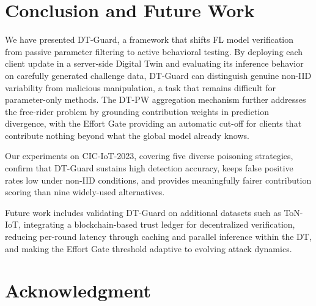 \documentclass[conference]{IEEEtran}
\begin{document}
    
    \section{Conclusion and Future Work}
    
    We have presented DT-Guard, a framework that shifts FL model verification from passive parameter filtering to active behavioral testing. By deploying each client update in a server-side Digital Twin and evaluating its inference behavior on carefully generated challenge data, DT-Guard can distinguish genuine non-IID variability from malicious manipulation, a task that remains difficult for parameter-only methods. The DT-PW aggregation mechanism further addresses the free-rider problem by grounding contribution weights in prediction divergence, with the Effort Gate providing an automatic cut-off for clients that contribute nothing beyond what the global model already knows.
    
    Our experiments on CIC-IoT-2023, covering five diverse poisoning strategies, confirm that DT-Guard sustains high detection accuracy, keeps false positive rates low under non-IID conditions, and provides meaningfully fairer contribution scoring than nine widely-used alternatives.
    
    Future work includes validating DT-Guard on additional datasets such as ToN-IoT, integrating a blockchain-based trust ledger for decentralized verification, reducing per-round latency through caching and parallel inference within the DT, and making the Effort Gate threshold adaptive to evolving attack dynamics.
    
    
    \section*{Acknowledgment}
    
    
    
    
    
    
    
\end{document}
